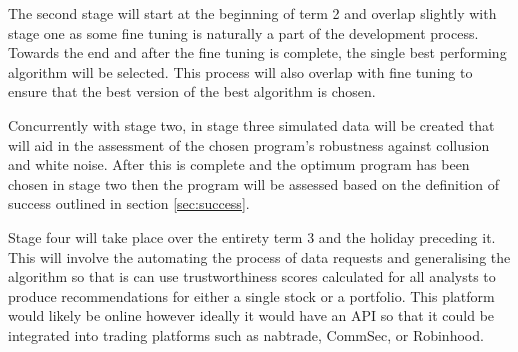 The second stage will start at the beginning of term 2 and overlap slightly with stage one as some fine tuning is naturally a part of the development process. Towards the end and after the fine tuning is complete, the single best performing algorithm will be selected. This process will also overlap with fine tuning to ensure that the best version of the best algorithm is chosen.

Concurrently with stage two, in stage three simulated data will be created that will aid in the assessment of the chosen program's robustness against collusion and white noise. After this is complete and the optimum program has been chosen in stage two then the program will be assessed based on the definition of success outlined in section \ref{sec:success}.

Stage four will take place over the entirety term 3 and the holiday preceding it. This will involve the automating the process of data requests and generalising the algorithm so that is can use trustworthiness scores calculated for all analysts to produce recommendations for either a single stock or a portfolio. This platform would likely be online however ideally it would have an API so that it could be integrated into trading platforms such as nabtrade, CommSec, or Robinhood.
